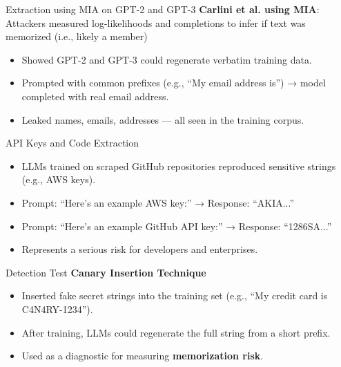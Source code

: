 \documentclass[12pt,aspectratio=169,handout]{beamer}
\begin{document}
\begin{frame}{Extraction using MIA on GPT-2 and GPT-3}
\textbf{Carlini et al. using MIA}: Attackers measured log-likelihoods and completions to infer if text was memorized (i.e., likely a member)
\begin{itemize}
    \item Showed GPT-2 and GPT-3 could regenerate verbatim training data.
    \item Prompted with common prefixes (e.g., “My email address is”) → model completed with real email address.
    \item Leaked names, emails, addresses — all seen in the training corpus.
\end{itemize}
\end{frame}

\begin{frame}{API Keys and Code Extraction}
\begin{itemize}
    \item LLMs trained on scraped GitHub repositories reproduced sensitive strings (e.g., AWS keys).
    \item Prompt: “Here's an example AWS key:” → Response: “AKIA...”
    \item Prompt: “Here's an example GitHub API key:” → Response: “1286SA...”
    \item Represents a serious risk for developers and enterprises.
\end{itemize}
\end{frame}

\begin{frame}{Detection Test}
\textbf{Canary Insertion Technique} 
\begin{itemize}
    \item Inserted fake secret strings into the training set (e.g., “My credit card is C4N4RY-1234”).
    \item After training, LLMs could regenerate the full string from a short prefix.
    \item Used as a diagnostic for measuring \color{red}\textbf{memorization risk}.
\end{itemize}
\end{frame}
\end{document}
